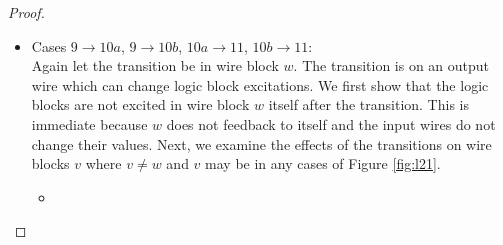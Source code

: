 \documentclass[12pt]{report}
\begin{document}
\begin{proof}
\begin{itemize}
\item
Cases $9\rightarrow10a$, $9\rightarrow10b$, $10a\rightarrow11$, $10b\rightarrow11$:  \\
Again let the transition be in wire block $w$.  The transition is on an output wire which can change logic block excitations.  We first show that the logic blocks are not excited in wire block $w$ itself after the transition.  This is immediate because $w$ does not feedback to itself and the input wires do not change their values.  
Next, we examine the effects of the transitions on wire blocks $v$ where $v\neq w$ and $v$ may be in any cases of Figure \ref{fig:l21}.  
\begin{itemize}
\item

\end{itemize}
\end{itemize}
\end{proof}
\end{document}
